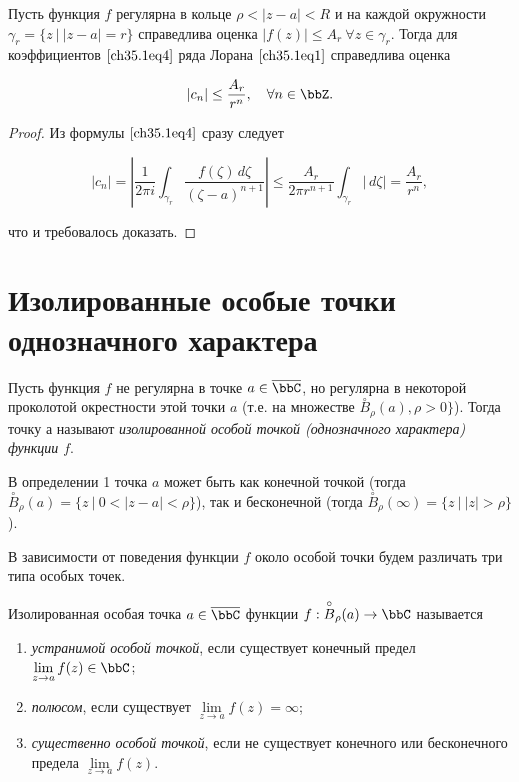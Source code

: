 \begin{cons} 
Пусть функция $f$ регулярна в кольце $\rho < |z - a| < R$ и на каждой окружности $\gamma_r = \{ z \: \big| \: |z - a| = r\}$ справедлива оценка $|f(z)| \le A_r \: \forall z \in \gamma_r$. Тогда для коэффициентов $\eqref{ch35.1eq4}$ ряда Лорана $\eqref{ch35.1eq1}$ справедлива оценка

\begin{equation} \label{ch35.1eq20}
|c_n| \le \frac{A_r}{r^n}, \quad \forall n \in \bbZ.
\end{equation}

\begin{proof}
Из формулы $\eqref{ch35.1eq4}$ сразу следует

$$
|c_n| = \left| \frac{1}{2\pi i} \int_{\gamma_r} \frac{f(\zeta)\,d\zeta}{(\zeta - a)^{n + 1}} \right| \le \frac{A_r}{2\pi r^{n + 1}} \int_{\gamma_r} |\,d\zeta| = \frac{A_r}{r^n},
$$

что и требовалось доказать.
\end{proof}
\end{cons}

\section{Изолированные особые точки однозначного характера}


\begin{defn}

Пусть функция $f$ не регулярна в точке $a \in \overline{\bbC}$, но регулярна в некоторой проколотой окрестности этой точки $a$ (т.е. на множестве $\overset{\circ}{B}_\rho(a), \rho > 0\}$). Тогда точку а называют \textit{изолированной особой точкой (однозначного характера) функции $f$}.

\end{defn}

В определении 1 точка $a$ может быть как конечной точкой (тогда $\overset{\circ}{B}_\rho(a) = \{ z \: \big| \: 0 < |z - a| < \rho\}$), так и бесконечной (тогда $\overset{\circ}{B}_\rho(\infty) = \{ z \: \big| \: |z| > \rho\}$).

В зависимости от поведения функции $f$ около особой точки будем различать три типа особых точек.

\begin{defn}
Изолированная особая точка $a \in \overline{\bbC}$ функции $f : \overset{\circ}{B}_\rho(a) \to \bbC$ называется
\begin{enumerate}
\item \textit{устранимой особой точкой}, если существует конечный предел $\lim\limits_{z \to a} f(z) \in \bbC$;
\item	\textit{полюсом}, если существует $\lim\limits_{z \to a} f(z) = \infty$;
\item \textit{существенно особой точкой}, если не существует конечного или бесконечного предела $\lim\limits_{z \to a} f(z)$.
\end{enumerate}
\end{defn}

